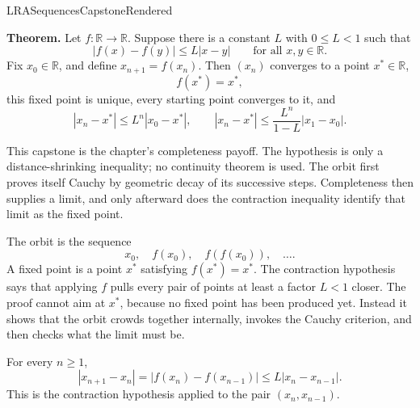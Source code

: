 \ifcsname LRASequencesCapstoneRendered\endcsname
\else
\expandafter\gdef\csname LRASequencesCapstoneRendered\endcsname{}

\label{prf:capstone-sequences}
\label{cap:sequences}

\begin{tcolorbox}[
  colback=gray!6,
  colframe=gray!40,
  arc=2pt,
  left=8pt, right=8pt, top=6pt, bottom=6pt,
  title={\small\textbf{Capstone Theorem: The Contraction Mapping Principle on \(\mathbb{R}\)}},
  fonttitle=\small\bfseries
]
\textbf{Theorem.}
Let \(f:\mathbb{R}\to\mathbb{R}\). Suppose there is a constant
\(L\) with \(0\le L<1\) such that
\[
  |f(x)-f(y)|\le L|x-y|
  \qquad
  \text{for all }x,y\in\mathbb{R}.
\]
Fix \(x_0\in\mathbb{R}\), and define \(x_{n+1}=f(x_n)\). Then
\((x_n)\) converges to a point \(x^\ast\in\mathbb{R}\),
\[
  f(x^\ast)=x^\ast,
\]
this fixed point is unique, every starting point converges to it, and
\[
  |x_n-x^\ast|\le L^n|x_0-x^\ast|,
  \qquad
  |x_n-x^\ast|\le \frac{L^n}{1-L}|x_1-x_0|.
\]
\end{tcolorbox}

\begin{remark*}[Interpretation]
This capstone is the chapter's completeness payoff. The hypothesis is only a
distance-shrinking inequality; no continuity theorem is used. The orbit first
proves itself Cauchy by geometric decay of its successive steps. Completeness
then supplies a limit, and only afterward does the contraction inequality
identify that limit as the fixed point.
\end{remark*}

\begin{remark*}[Orientation]
The orbit is the sequence
\[
  x_0,\quad f(x_0),\quad f(f(x_0)),\quad \ldots .
\]
A fixed point is a point \(x^\ast\) satisfying \(f(x^\ast)=x^\ast\). The
contraction hypothesis says that applying \(f\) pulls every pair of points at
least a factor \(L<1\) closer. The proof cannot aim at \(x^\ast\), because no
fixed point has been produced yet. Instead it shows that the orbit crowds
together internally, invokes the Cauchy criterion, and then checks what the
limit must be.
\end{remark*}

\begin{remark*}[Interpretation]
For every \(n\ge 1\),
\[
  |x_{n+1}-x_n|
  =
  |f(x_n)-f(x_{n-1})|
  \le
  L|x_n-x_{n-1}|.
\]
This is the contraction hypothesis applied to the pair
\((x_n,x_{n-1})\).
\end{remark*}

